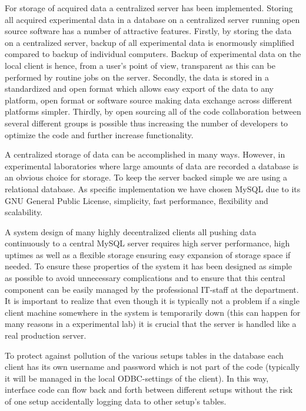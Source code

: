For storage of acquired data a centralized server has been implemented. Storing
all acquired experimental data in a database on a centralized server running
open source software has a number of attractive features. Firstly, by storing
the data on a centralized server, backup of all experimental data is enormously
simplified compared to backup of individual computers. Backup of experimental
data on the local client is hence, from a user's point of view, transparent as
this can be performed by routine jobs on the server. Secondly, the data is
stored in a standardized and open format which allows easy export of the data
to any platform, open format or software source making data exchange across
different platforms simpler. Thirdly, by open sourcing all of the code
collaboration between several different groups is possible thus increasing the
number of developers to optimize the code and further increase functionality.

A centralized storage of data can be accomplished in many ways. However, in
experimental laboratories where large amounts of data are recorded a database
is an obvious choice for storage. To keep the server backed simple we are using
a relational database. As specific implementation we have chosen MySQL due to
its GNU General Public License, simplicity, fast performance, flexibility and
scalability.

A system design of many highly decentralized clients all pushing data
continuously to a central MySQL server requires high server performance, high
uptimes as well as a flexible storage ensuring easy expansion of storage space
if needed. To ensure these properties of the system it has been designed as
simple as possible to avoid unnecessary complications and to ensure that this
central component can be easily managed by the professional IT-staff at the
department. It is important to realize that even though it is typically not a
problem if a single client machine somewhere in the system is temporarily down
(this can happen for many reasons in a experimental lab) it is crucial that the
server is handled like a real production server.

To protect against pollution of the various setups tables in the database each
client has its own username and password which is not part of the code
(typically it will be managed in the local ODBC-settings of the client). In
this way, interface code can flow back and forth between different setups
without the risk of one setup accidentally logging data to other setup's
tables.

